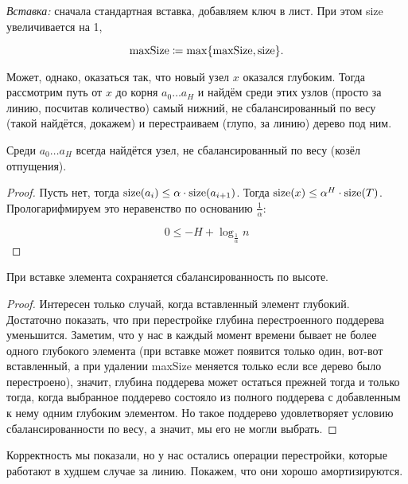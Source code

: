 {\it Вставка:} сначала стандартная вставка, добавляем ключ в лист. При этом size увеличивается на 1,

\begin{equation*}
	\text{maxSize} \coloneqq \max \set*{\text{maxSize},\text{size}}.
\end{equation*}

Может, однако, оказаться так, что новый узел $x$ оказался глубоким. Тогда рассмотрим путь от $x$ до корня $a_0 \ldots a_{H}$ и найдём среди этих узлов (просто за линию, посчитав количество) самый нижний, не сбалансированный по весу (такой найдётся, докажем) и перестраиваем (глупо, за линию) дерево под ним.

\begin{theorem}
	Среди $a_0 \ldots a_{H}$ всегда найдётся узел, не сбалансированный по весу (козёл отпущения).
\end{theorem}

\begin{proof}
	Пусть нет, тогда $\operatorname{size} (a_i) \le \alpha \cdot \operatorname{size} (a_{i+1})$. Тогда $\operatorname{size} (x) \le \alpha^H \cdot \operatorname{size} (T)$. Прологарифмируем это неравенство по основанию $\frac{1}{\alpha}$:

	\begin{equation*}
		0 \le -H + \log_{\frac{1}{\alpha}} n
	\end{equation*}
\end{proof}

\begin{theorem}
	При вставке элемента сохраняется сбалансированность по высоте.
\end{theorem}
\begin{proof}
	Интересен только случай, когда вставленный элемент глубокий. Достаточно показать, что при перестройке глубина перестроенного поддерева уменьшится. Заметим, что у нас в каждый момент времени бывает не более одного глубокого элемента (при вставке может появится только один, вот-вот вставленный, а при удалении maxSize меняется только если все дерево было перестроено), значит, глубина поддерева может остаться прежней тогда и только тогда, когда выбранное поддерево состояло из полного поддерева с добавленным к нему одним глубоким элементом. Но такое поддерево удовлетворяет условию сбалансированности по весу, а значит, мы его не могли выбрать.
\end{proof}

Корректность мы показали, но у нас остались операции перестройки, которые работают в худшем случае за линию. Покажем, что они хорошо амортизируются.

